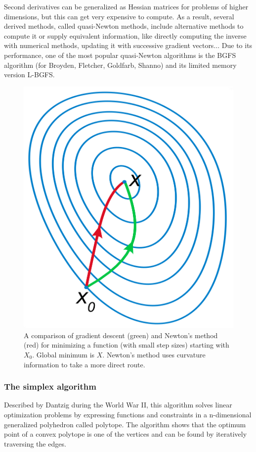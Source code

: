 Second derivatives can be generalized as Hessian matrices for problems of higher dimensions, but this can get very expensive to compute. As a result, several derived methods, called quasi-Newton methods, include alternative methods to compute it or supply equivalent information, like directly computing the inverse with numerical methods, updating it with successive gradient vectors$ \ldots $  Due to its performance, one of the most popular quasi-Newton algorithms is the BGFS algorithm (for Broyden, Fletcher, Goldfarb, Shanno) and its limited memory version L-BGFS.



\begin{figure}[H]
	\includegraphics[width=\textwidth]{./figures/04/gradientdescent.png}
	\caption[Gradient descent vs Newton's optimization]{A comparison of gradient descent (green) and Newton's method (red) for minimizing a function (with small step sizes) starting with $ X_{0} $. Global minimum is $ X $. Newton's method uses curvature information to take a more direct route.}
	\label{fig:gradientdescent}
\end{figure}

\subsubsection{The simplex algorithm}
Described by Dantzig during the World War II, this algorithm solves linear optimization problems by expressing functions and constraints in a n-dimensional generalized polyhedron called polytope. The algorithm shows that the optimum point of a convex polytope is one of the vertices and can be found by iteratively traversing the edges.

